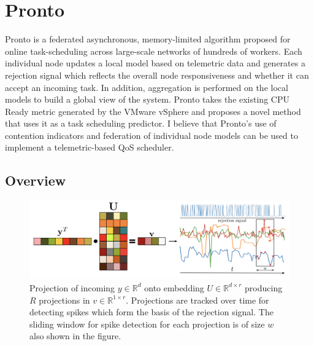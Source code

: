 \section{Pronto}
Pronto is a federated asynchronous, memory-limited algorithm proposed for
online task-scheduling across large-scale networks of hundreds of workers. Each
individual node updates a local model based on telemetric data and generates a
rejection signal which reflects the overall node responsiveness and whether it
can accept an incoming task. In addition, aggregation is performed on the local
models to build a global view of the system. Pronto takes the existing CPU Ready
metric generated by the VMware vSphere and proposes a novel method that uses it
as a task scheduling predictor. I believe that Pronto's use of contention
indicators and federation of individual node models can be used to implement a
telemetric-based QoS scheduler.


\subsection{Overview}
\label{pronto-overview}

\begin{figure}[H]
    \centering
    \includegraphics[width=\textwidth]{images/pronto}
    \caption{Projection of incoming $y \in \mathbb{R}^d$ onto embedding $U \in
    \mathbb{R}^{d \times r}$ producing $R$ projections in $v \in \mathbb{R}^{1
    \times r}$. Projections are tracked over time for detecting spikes which
    form the basis of the rejection signal. The sliding window for spike
    detection for each projection is of size $w$ also shown in the figure.}
    \label{pronto-components}
\end{figure}

